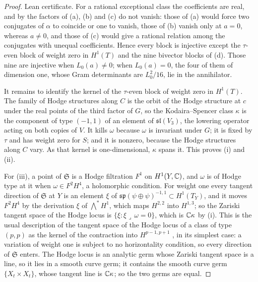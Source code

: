 \begin{proof}
Lean certificate. For a rational exceptional class the coefficients are real,
and by  the factors of (a), (b) and (c) do not vanish:
those of (a) would force two conjugates of $\alpha$ to coincide or one to
vanish, those of (b) vanish only at $a=0$, whereas $a\ne0$, and those of (c)
would give a rational relation among the conjugates with unequal
coefficients. Hence every block is injective except the $\tau$-even block of
weight zero in $H^{1}(T)$ and the nine bivector blocks of (d). Those nine are
injective when $L_{0}(a)\ne0$; when $L_{0}(a)=0$, the four of them of
dimension one, whose Gram determinants are $L_{0}^{2}/16$, lie in the
annihilator.

It remains to identify the kernel of the $\tau$-even block of weight zero in
$H^{1}(T)$. The family of Hodge structures along $C$ is the orbit of the
Hodge structure at $c$ under the real points of the third factor of $G$, so
the Kodaira--Spencer class
$\kappa$ is the component of type $(-1,1)$ of an element of
$\mathfrak{sl}(V_{3})$, the lowering operator acting on both copies of $V$.
It kills $\omega$ because $\omega$ is invariant under $G$; it is fixed by
$\tau$ and has weight zero for $S$; and it is nonzero, because the Hodge
structures along $C$ vary. As that kernel is one-dimensional, $\kappa$ spans
it. This proves (i) and (ii).

For (iii), a point of $\mathfrak{S}$ is a Hodge filtration $F^{1}$ on
$H^{1}(Y,\mathbb{C})$, and $\omega$ is of Hodge type at it when $\omega\in F^{2}
H^{4}$, a holomorphic condition. For weight one every tangent direction of
$\mathfrak{S}$ at $Y$ is an element $\xi$ of
$\mathfrak{sp}(\psi\oplus\psi)^{-1,1}\subset H^{1}(T_{Y})$, and it moves
$F^{2}H^{4}$ by the derivation $\xi$ of ${\textstyle\bigwedge^{*}}H^{1}$, which maps
$H^{2,2}$ into $H^{1,3}$; so the Zariski tangent space of the Hodge locus is
$\{\xi:\xi\lrcorner\,\omega=0\}$, which is $\mathbb{C}\kappa$ by (i). This is the
usual description of the tangent space of the Hodge locus of a class of type
$(p,p)$ as the kernel of the contraction into $H^{p-1,p+1}$
\cite[Chapter~5]{Voi03}, in its simplest case: a variation of weight one is
subject to no horizontality condition, so every direction of $\mathfrak{S}$
enters. The Hodge locus is an analytic germ whose
Zariski tangent space is a line, so it lies in a smooth curve germ; it
contains the smooth curve germ $\{X_{t}\times X_{t}\}$, whose tangent line is
$\mathbb{C}\kappa$; so the two germs are equal.
\end{proof}


